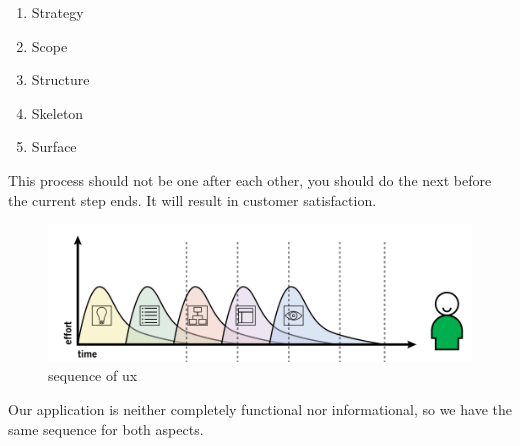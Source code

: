 \begin{enumerate}
    \item Strategy
    \item Scope
    \item Structure
    \item Skeleton
    \item Surface
\end{enumerate}
This process should not be one after each other, you should do the next before the current step ends. It will result in customer satisfaction.
\begin{figure}
    \includegraphics[width=\linewidth]{images/pic1.png}
    \caption{sequence of ux}
\end{figure}
Our application is neither completely functional nor informational, so we have the same sequence for both aspects.
